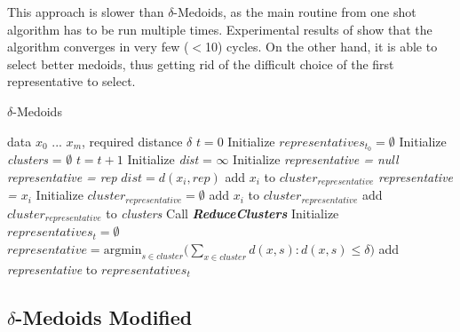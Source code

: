 \documentclass[thesis=B,english]{FITthesis}[2012/10/20]
\begin{document}
This approach is slower than $\delta$-Medoids, as the main routine from one shot algorithm has to be run multiple times.
Experimental results of \cite{liebman2015representative} show that the algorithm converges in very few ($<$10) cycles. 
On the other hand, it is able to select better medoids, thus getting rid of the difficult choice of the first representative to select.

\begin{algorithm}
    \caption{$\delta$-Medoids}
    \label{alg:delta_medoids_full}
    \begin{algorithmic}[1]
        \INPUT data $x_0$ ... $x_m$, required distance $\delta$
        \STATE $t = 0$
        \STATE Initialize $representatives_{t_0} = \emptyset$
        \STATE Initialize \textit{clusters} = $\emptyset$
        \DO
            \STATE $t = t + 1$
                \STATE Initialize \textit{dist} = $\infty$
                \STATE Initialize \textit{representative = null}
                        \STATE \textit{representative = rep}
                        \STATE $dist = d(x_i, rep)$
                    \ENDIF
                \ENDFOR
                    \STATE add $x_i$ to $cluster_{representative}$
                \ELSE
                    \STATE \textit{representative = $x_i$}
                    \STATE Initialize $cluster_{representative} = \emptyset$
                    \STATE add $x_i$ to $cluster_{representative}$
                    \STATE add $cluster_{representative}$ to \textit{clusters}
                \ENDIF
            \ENDFOR
            \STATE Call \textbf{\textit{ReduceClusters}}
            \STATE Initialize $representatives_t = \emptyset$
                \STATE $representative = \textrm{argmin}_{s \in cluster} (\sum\limits_{x \in cluster}{d(x,s) : d(x,s) \le \delta)}$
                \STATE add \textit{representative} to $representatives_t$
            \ENDFOR
    \end{algorithmic}
\end{algorithm}

\subsection{$\delta$-Medoids Modified}
\label{sec:modified}
\end{document}
